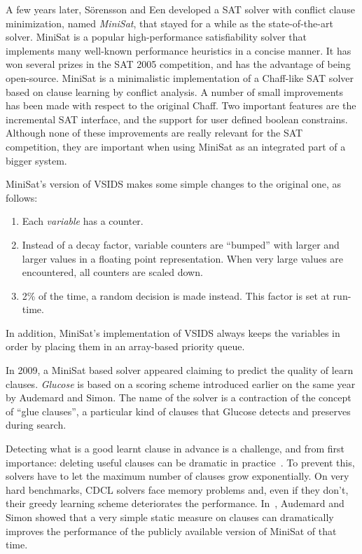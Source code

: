 A few years later, S\"orensson and Een developed a SAT solver with conflict
clause minimization, named \emph{MiniSat}, that stayed for a while as the
state-of-the-art solver. MiniSat is a popular high-performance satisfiability
solver that implements many well-known performance heuristics in a concise
manner. It has won several prizes in the SAT 2005 competition, and has the
advantage of being open-source. MiniSat is a minimalistic implementation of a
Chaff-like SAT solver based on clause learning by conflict analysis. A number of
small improvements has been made with respect to the original Chaff. Two
important features are the incremental SAT interface, and the support for user
defined boolean constrains. Although none of these improvements are really
relevant for the SAT competition, they are important when using MiniSat as an
integrated part of a bigger system. 

MiniSat's version of VSIDS makes some simple changes to the original one, as
follows:

\begin{enumerate}
    \item Each \emph{variable} has a counter.
    \item Instead of a decay factor, variable counters are ``bumped'' with
        larger and larger values in a floating point representation. When very
        large values are encountered, all counters are scaled down.
    \item 2\% of the time, a random decision is made instead. This factor is set
        at run-time.
\end{enumerate}
In addition, MiniSat's implementation of VSIDS always keeps the variables in
order by placing them in an array-based priority queue.

In 2009, a MiniSat based solver appeared claiming to predict the quality of
learn clauses. \emph{Glucose} is based on a scoring scheme introduced earlier on
the same year by Audemard and Simon. The name of the solver is a contraction of
the concept of ``glue clauses'', a particular kind of clauses that Glucose
detects and preserves during search.

Detecting what is a good learnt clause in advance is a challenge, and from first
importance: deleting useful clauses can be dramatic in practice~\cite{glucose}.
To prevent this, solvers have to let the maximum number of clauses grow
exponentially. On very hard benchmarks, CDCL solvers face memory problems and,
even if they don't, their greedy learning scheme deteriorates the performance.
In~\cite{audemard2009predicting}, Audemard and Simon showed that a very simple
static measure on clauses can dramatically improves the performance of the
publicly available version of MiniSat of that time.

